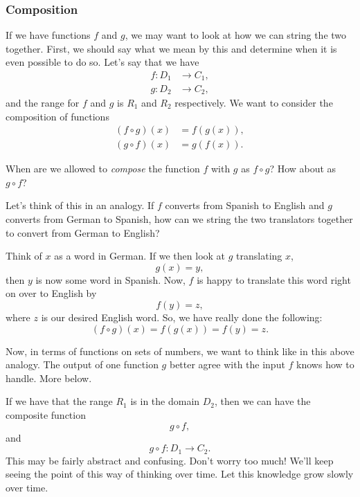    \subsubsection{Composition}

    If we have functions $f$ and $g$, we may want to look at how we can string the two together.  First, we should say what we mean by this and determine when it is even possible to do so.  Let's say that we have
    \begin{align*}
        f\colon D_1 &\to C_1,\\
        g\colon D_2 &\to C_2,
    \end{align*}
    and the range for $f$ and $g$ is $R_1$ and $R_2$ respectively.  We want to consider the composition of functions
    \begin{align*}
        (f\circ g)(x) &= f(g(x)),\\
        (g\circ f)(x) &= g(f(x)).
    \end{align*}

    \begin{question}
    When are we allowed to \emph{compose} the function $f$ with $g$ as $f\circ g$? How about as $g\circ f$?
    \end{question}

    \begin{answer}
    Let's think of this in an analogy.  If $f$ converts from Spanish to English and $g$ converts from German to Spanish, how can we string the two translators together to convert from German to English?

    Think of $x$ as a word in German.  If we then look at $g$ translating $x$,
    \[
    g(x)=y,
    \]
    then $y$ is now some word in Spanish.  Now, $f$ is happy to translate this word right on over to English by
    \[
    f(y)=z,
    \]
    where $z$ is our desired English word.  So, we have really done the following:
    \[
    (f\circ g)(x)=f(g(x))=f(y)=z.
    \]

    Now, in terms of functions on sets of numbers, we want to think like in this above analogy.  The output of one function $g$ better agree with the input $f$ knows how to handle.  More below.
    \end{answer}

    If we have that the range $R_1$ is in the domain $D_2$, then we can have the composite function
    \[
    g\circ f,
    \]
    and
    \[
    g\circ f \colon D_1 \to C_2.
    \]
    This may be fairly abstract and confusing.  Don't worry too much! We'll keep seeing the point of this way of thinking over time. Let this knowledge grow slowly over time.

